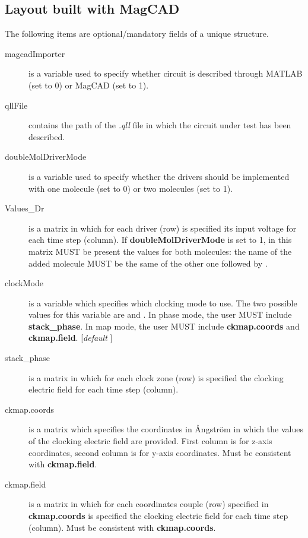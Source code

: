 \documentclass[a4paper,10pt]{article}
\begin{document}
\subsection{Layout built with MagCAD}\label{subsec:magcad_layout}
\noindent The following items are optional/mandatory fields of a unique structure. 

\begin{description}
\item[magcadImporter \danger] is a variable used to specify whether circuit is described through MATLAB (set to 0) or MagCAD (set to 1).

\item[qllFile \danger] contains the path of the \textit{.qll} file in which the circuit under test has been described.

\item[doubleMolDriverMode \danger] is a variable used to specify whether the drivers should be implemented with one molecule (set to 0) or two molecules (set to 1).

\item[Values\_Dr \danger] is a matrix in which for each driver (row) is specified its input voltage for each time step (column). If \textbf{doubleMolDriverMode} is set to 1, in this matrix MUST be present the values for both molecules: the name of the added molecule MUST be the same of the other one followed by \textcolor{mylilas}{\textquotesingle}.

\item[clockMode] is a variable which specifies which clocking mode to use. The two possible values for this variable are \textcolor{mylilas}{\textquotesingle} and \textcolor{mylilas}{\textquotesingle}. In phase mode, the user MUST include \textbf{stack\_phase}. In map mode, the user MUST include \textbf{ckmap.coords} and \textbf{ckmap.field}. [\textit{default} \textquotesingle]

\item[stack\_phase \danger] is a matrix in which for each clock zone (row) is specified the clocking electric field for each time step (column).

\item[ckmap.coords \danger] is a matrix which specifies the coordinates in \r{A}ngstr\"{o}m in which the values of the clocking electric field are provided. First column is for z-axis coordinates, second column is for y-axis coordinates. Must be consistent with \textbf{ckmap.field}. 

\item[ckmap.field \danger] is a matrix in which for each coordinates couple (row) specified in \textbf{ckmap.coords} is specified the clocking electric field for each time step (column). Must be consistent with \textbf{ckmap.coords}. 

 
\end{description}
\end{document}
